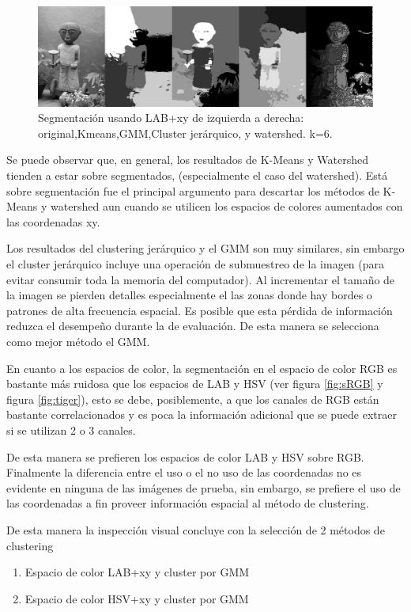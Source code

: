 \documentclass[10pt,twocolumn,letterpaper]{article}
\begin{document}
\begin{figure}
\begin{center}
\includegraphics[width=0.95\linewidth]
                 {img/LABXYSample.jpg}
\end{center}
 \caption{Segmentación usando LAB+xy de izquierda a derecha: original,Kmeans,GMM,Cluster jerárquico, y watershed. k=6.}
\label{fig:SLABXY}
\end{figure}


Se puede observar que, en general, los resultados de K-Means y Watershed tienden a estar sobre segmentados, (especialmente el caso del watershed). Está sobre segmentación fue el principal argumento para descartar los métodos de K-Means y watershed aun cuando se utilicen los espacios de colores aumentados con las coordenadas xy.

Los resultados del clustering jerárquico y el GMM son muy similares, sin embargo el cluster jerárquico incluye una operación de submuestreo de la imagen (para evitar consumir toda la memoria del computador). Al incrementar el tamaño de la imagen se pierden detalles especialmente el las zonas donde hay bordes o patrones de alta frecuencia espacial. Es posible que esta pérdida de información reduzca el desempeño durante la de evaluación. De esta manera se selecciona como mejor método el GMM.

En cuanto a los espacios de color, la segmentación en el espacio de color RGB es bastante más ruidosa que los espacios de LAB y HSV (ver figura \ref{fig:sRGB} y figura \ref{fig:tiger}), esto se debe, posiblemente, a que los canales de RGB están bastante correlacionados y es poca la información adicional que se puede extraer si se utilizan 2 o 3 canales.

De esta manera se prefieren los espacios de color LAB y HSV sobre RGB. Finalmente la diferencia entre el uso o el no uso de las coordenadas no es evidente en ninguna de las imágenes de prueba, sin embargo, se prefiere el uso de las coordenadas a fin proveer información espacial al método de clustering.


De esta manera la inspección visual concluye con la selección de 2 métodos de clustering
\begin{enumerate}
	\item Espacio de color LAB+xy y cluster por GMM
	\item Espacio de color HSV+xy y cluster por GMM
\end{enumerate}
\end{document}
